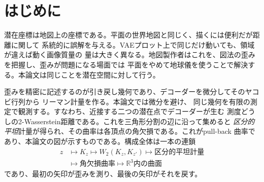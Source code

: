\begin{abstract}
2次元の潜在プロットは歪んだ地図である。エンコーダーがたまたま選んだ座標で
描かれており、デコーダーが実際に生み出す幾何ではない。そのため、プロット上で
同じだけ動いても、動く確率質量の量は場所によって大きく違う。本論文は、この歪みを
測り、そして元に戻す。

デコーダーの幾何を、指定した潜在三角形分割へ引き戻す。具体的には、メッシュの各辺で
デコードされた測度どうしの2-Wasserstein距離を計算する。こうして得られる区分的平坦
計量は角欠損曲率をもち、これが可視化する対象すなわちpull-back曲率である。歪みを
戻すとは、この計量を座標として実現することであり、そのために必要な最小の周囲次元、
すなわち平坦な潜在平面に1次元だけ加えた $\mathbb R^3$ 内の曲面を用いる。

三つの問いに厳密な答えを与える。必要な次元数は、中心化グラム行列の階数で決まる。
戻した形状が一意かどうかは曲率の符号で決まる。角欠損が非負の閉曲面はAlexandrovの
定理により剛であり、曲率の符号が混在すると、どれだけデータを増やしても消えない
曲げの自由度が残る。実際にどれだけ戻せたかは、面ごとの特異値と接続面の角度変化で
決まり、いずれも入出力から計算でき、小誤差の仮定を要しない。

\end{abstract}

\section{はじめに}

潜在座標は地図上の座標である。平面の世界地図と同じく、描くには便利だが距離に関して
系統的に誤解を与える。VAEプロット上で同じだけ動いても、領域が違えば動く画像質量の
量は大きく異なる。地図製作者はこれを、図法の歪みを把握し、歪みが問題になる場面では
平面をやめて地球儀を使うことで解決する。本論文は同じことを潜在空間に対して行う。

歪みを精密に記述するのが引き戻し幾何であり、デコーダーを微分してそのヤコビ行列から
リーマン計量を作る\cite{arvanitidis2018,chen2018,roy2022}。本論文では微分を避け、
同じ幾何を有限の測定で観測する。すなわち、近接する二つの潜在点でデコーダーが生む
測度どうしの2-Wasserstein距離である。これを三角形分割の辺に沿って集めると
\emph{区分的平坦}計量が得られ、その曲率は各頂点の角欠損である。これがpull-back
曲率であり、本論文の図が示すものである。構成全体は一本の連鎖
\begin{equation}
 \begin{aligned}
 z&\longmapsto K_z
 \longmapsto W_2(K_z,K_{z'})
 \longmapsto \text{区分的平坦計量}\\
 &\longmapsto \text{角欠損曲率}
 \longmapsto \mathbb R^3\text{内の曲面}
 \end{aligned}
 \label{eq:paper-chain}
\end{equation}
であり、最初の矢印が歪みを測り、最後の矢印がそれを戻す。

